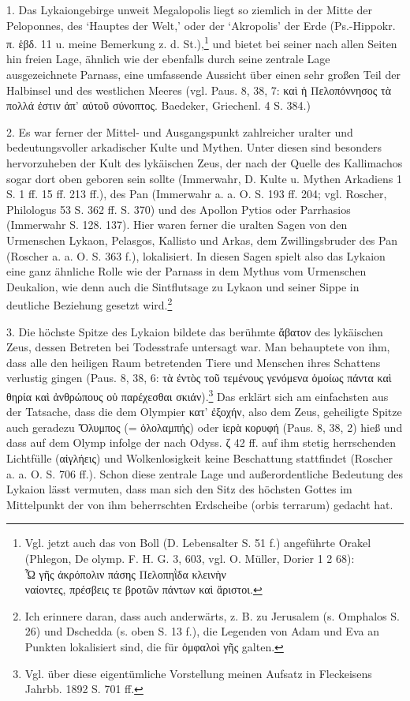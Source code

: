 \documentclass[a4paper, 11pt, oneside]{article}
\begin{document}
1. Das Lykaiongebirge unweit Megalopolis liegt so ziemlich in der Mitte der Peloponnes, des `Hauptes der Welt,' oder der `Akropolis' der Erde (Ps.-Hippokr. π. ἑβδ. 11 u. meine Bemerkung z. d. St.),\footnote{Vgl. jetzt auch das von Boll (D. Lebensalter S. 51 f.) angeführte Orakel (Phlegon, De olymp. F. H. G. 3, 603, vgl. O. Müller, Dorier 1 2 68):\\\hspace*{10mm}Ὦ γῆς ἀκρόπολιν πάσης Πελοπηῒδα κλεινὴν\\\hspace*{10mm}ναίοντες, πρέσβεις τε βροτῶν πάντων καὶ ἄριστοι.} und bietet bei seiner nach allen Seiten hin freien Lage, ähnlich wie der ebenfalls durch seine zentrale Lage ausgezeichnete Parnass, eine umfassende Aussicht über einen sehr großen Teil der Halbinsel und des westlichen Meeres (vgl. Paus. 8, 38, 7: καὶ ἡ Πελοπόννησος τὰ πολλά ἐστιν ἀπ' αὐτοῦ σύνοπτος. Baedeker, Griechenl. 4 S. 384.)

2. Es war ferner der Mittel- und Ausgangspunkt zahlreicher uralter und bedeutungsvoller arkadischer Kulte und Mythen. Unter diesen sind besonders hervorzuheben der Kult des lykäischen Zeus, der nach der Quelle des Kallimachos sogar dort oben geboren sein sollte (Immerwahr, D. Kulte u. Mythen Arkadiens 1 S. 1 ff. 15 ff. 213 ff.), des Pan (Immerwahr a. a. O. S. 193 ff. 204; vgl. Roscher, Philologus 53 S. 362 ff. S. 370) und des Apollon Pytios oder Parrhasios (Immerwahr S. 128. 137). Hier waren ferner die uralten Sagen von den Urmenschen Lykaon, Pelasgos, Kallisto und Arkas, dem Zwillingsbruder des Pan (Roscher a. a. O. S. 363 f.), lokalisiert. In diesen Sagen spielt also das Lykaion eine ganz ähnliche Rolle wie der Parnass in dem Mythus vom Urmenschen Deukalion, wie denn auch die Sintflutsage zu Lykaon und seiner Sippe in deutliche Beziehung gesetzt wird.\footnote{Ich erinnere daran, dass auch anderwärts, z. B. zu Jerusalem (s. Omphalos S. 26) und Dschedda (s. oben S. 13 f.), die Legenden von Adam und Eva an Punkten lokalisiert sind, die für ὀμφαλοὶ γῆς galten.}

3. Die höchste Spitze des Lykaion bildete das berühmte ἄβατον des lykäischen Zeus, dessen Betreten bei Todesstrafe untersagt war. Man behauptete von ihm, dass alle den heiligen Raum betretenden Tiere und Menschen ihres Schattens verlustig gingen (Paus. 8, 38, 6: τὰ ἐντὸς τοῦ τεμένους γενόμενα ὁμοίως πάντα καὶ θηρία καὶ ἀνθρώπους οὐ παρέχεσθαι σκιάν).\footnote{Vgl. über diese eigentümliche Vorstellung meinen Aufsatz in Fleckeisens Jahrbb. 1892 S. 701 ff.} Das erklärt sich am einfachsten aus der Tatsache, dass die dem Olympier κατ' ἐξοχήν, also dem Zeus, geheiligte Spitze auch geradezu Ὄλυμπος (= ὁλολαμπής) oder ἱερὰ κορυφή (Paus. 8, 38, 2) hieß und dass auf dem Olymp infolge der nach Odyss. ζ 42 ff. auf ihm stetig herrschenden Lichtfülle (αἰγλήεις) und Wolkenlosigkeit keine Beschattung stattfindet (Roscher a. a. O. S. 706 ff.). Schon diese zentrale Lage und außerordentliche Bedeutung des Lykaion lässt vermuten, dass man sich den Sitz des höchsten Gottes im Mittelpunkt der von ihm beherrschten Erdscheibe (orbis terrarum) gedacht hat.
\end{document}
